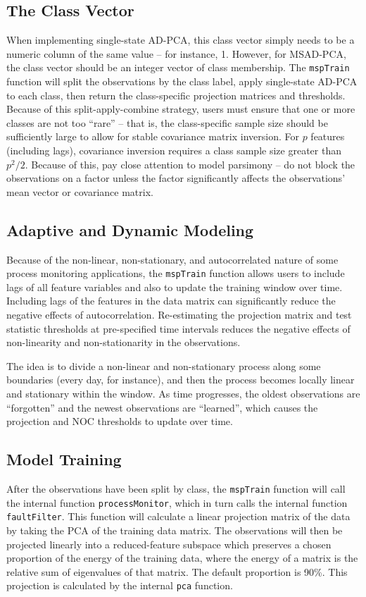\documentclass{report}\usepackage[]{graphicx}\usepackage[]{color}
\begin{document}
\subsection{The Class Vector}
When implementing single-state AD-PCA, this class vector simply needs to be a numeric column of the same value -- for instance, 1. However, for MSAD-PCA, the class vector should be an integer vector of class membership. The \texttt{mspTrain} function will split the observations by the class label, apply single-state AD-PCA to each class, then return the class-specific projection matrices and thresholds. Because of this split-apply-combine strategy, users must ensure that one or more classes are not too ``rare'' -- that is, the class-specific sample size should be sufficiently large to allow for stable covariance matrix inversion. For $p$ features (including lags), covariance inversion requires a class sample size greater than $p ^ 2 / 2$. Because of this, pay close attention to model parsimony -- do not block the observations on a factor unless the factor significantly affects the observations' mean vector or covariance matrix.


\subsection{Adaptive and Dynamic Modeling}
Because of the non-linear, non-stationary, and autocorrelated nature of some process monitoring applications, the \texttt{mspTrain} function allows users to include lags of all feature variables and also to update the training window over time. Including lags of the features in the data matrix can significantly reduce the negative effects of autocorrelation. Re-estimating the projection matrix and test statistic thresholds at pre-specified time intervals reduces the negative effects of non-linearity and non-stationarity in the observations.

The idea is to divide a non-linear and non-stationary process along some boundaries (every day, for instance), and then the process becomes locally linear and stationary within the window. As time progresses, the oldest observations are ``forgotten'' and the newest observations are ``learned'', which causes the projection and NOC thresholds to update over time.


\subsection{Model Training}
After the observations have been split by class, the \texttt{mspTrain} function will call the internal function \texttt{processMonitor}, which in turn calls the internal function \texttt{faultFilter}. This function will calculate a linear projection matrix of the data by taking the PCA of the training data matrix. The observations will then be projected linearly into a reduced-feature subspace which preserves a chosen proportion of the energy of the training data, where the energy of a matrix is the relative sum of eigenvalues of that matrix. The default proportion is 90\%. This projection is calculated by the internal \texttt{pca} function.
\end{document}
